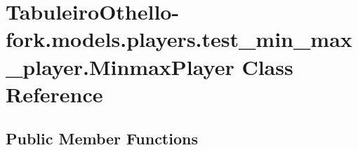 \hypertarget{class_tabuleiro_othello-fork_1_1models_1_1players_1_1test__min__max__player_1_1_minmax_player}{}\section{Tabuleiro\+Othello-\/fork.models.\+players.\+test\+\_\+min\+\_\+max\+\_\+player.\+Minmax\+Player Class Reference}
\label{class_tabuleiro_othello-fork_1_1models_1_1players_1_1test__min__max__player_1_1_minmax_player}
\subsection*{Public Member Functions}
